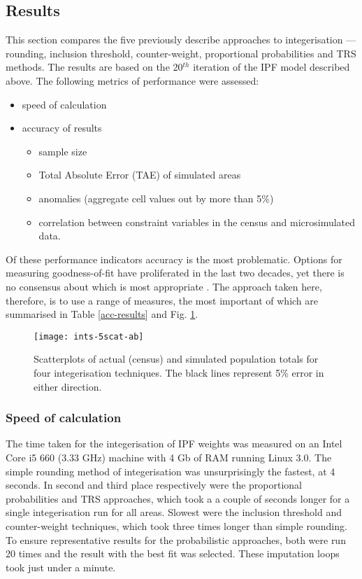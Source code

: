 \subsection{Results}
\label{results}
This section compares the five previously describe approaches to
integerisation --- rounding, inclusion threshold, counter-weight, proportional
probabilities  and TRS methods. The results are based on the 20$^{th}$
iteration of the IPF model described above. The following metrics of
performance were assessed:
\begin{itemize}
 \item speed of calculation
\item accuracy of results
\begin{itemize}
 \item sample size
\item Total Absolute Error (TAE) of simulated areas
\item anomalies (aggregate cell values out by more than 5\%)
\item correlation between constraint variables in the census and
microsimulated data.
\end{itemize}
\end{itemize}

Of these performance indicators accuracy is the most problematic.
Options for measuring goodness-of-fit have proliferated in the last two decades,
yet there is no consensus about which is most appropriate \citep{Voas2001}.
The approach taken here, therefore, is to use a range of measures, the most
important of which are summarised in Table \ref{acc-results} and Fig.
\ref{fig:3scat}.

\begin{figure}[h*]
 \centerline{
 \texttt{[image: ints-5scat-ab]}}
 \caption[Scatterplots of actual (census) and simulated population
totals]{Scatterplots of actual (census) and simulated population totals for four
integerisation techniques. The black lines represent 5\% error in either
direction. }
 \label{fig:3scat}
\end{figure}

\subsubsection{Speed of calculation}
The time taken for the integerisation of IPF weights was measured on an Intel
Core i5 660 (3.33 GHz) machine with 4 Gb of RAM running Linux 3.0.
The simple rounding method of integerisation was unsurprisingly the fastest, at
4 seconds. %
In second and third place respectively were the proportional probabilities
and TRS approaches, which took a a couple of seconds longer for a single
integerisation run for all areas.
Slowest were the inclusion threshold and counter-weight techniques, which took
three times longer than simple rounding. To ensure representative results for
the probabilistic approaches, both were run 20 times and the result with the
best fit was selected. These imputation loops took just under a minute.

